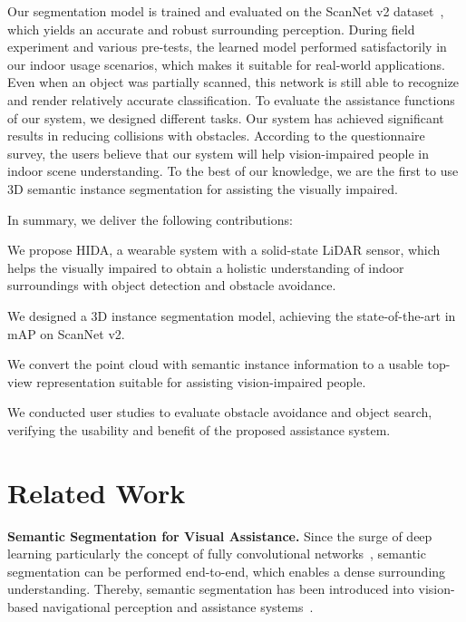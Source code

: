 \documentclass[10pt,twocolumn,letterpaper]{article}
\begin{document}

Our segmentation model is trained and evaluated on the ScanNet v2 dataset~\cite{scannet}, which yields an accurate and robust surrounding perception. During field experiment and various pre-tests, the learned model performed satisfactorily in our indoor usage scenarios, which makes it suitable for real-world applications. Even when an object was partially scanned, this network is still able to recognize and render relatively accurate classification. To evaluate the assistance functions of our system, we designed different tasks. Our system has achieved significant results in reducing collisions with obstacles. According to the questionnaire survey, the users believe that our system will help vision-impaired people in indoor scene understanding. To the best of our knowledge, we are the first to use 3D semantic instance segmentation for assisting the visually impaired.

In summary, we deliver the following contributions:
\begin{compactitem}
    \item We propose HIDA, a wearable system with a solid-state LiDAR sensor, which helps the visually impaired to obtain a holistic understanding of indoor surroundings with object detection and obstacle avoidance. 
    \item We designed a 3D instance segmentation model, achieving the state-of-the-art in mAP on ScanNet v2.
    \item We convert the point cloud with semantic instance information to a usable top-view representation suitable for assisting vision-impaired people.
    \item We conducted user studies to evaluate obstacle avoidance and object search, verifying the usability and benefit of the proposed assistance system.
\end{compactitem}

\section{Related Work}

\noindent\textbf{Semantic Segmentation for Visual Assistance.}
Since the surge of deep learning particularly the concept of fully convolutional networks~\cite{fcn}, semantic segmentation can be performed end-to-end, which enables a dense surrounding understanding. Thereby, semantic segmentation has been introduced into vision-based navigational perception and assistance systems~\cite{duh2020v,hsieh2020development,lin2019deep,mahendran2021computer,miksik2015semantic,watson2020footprints,zhang2021perception}.
\end{document}
